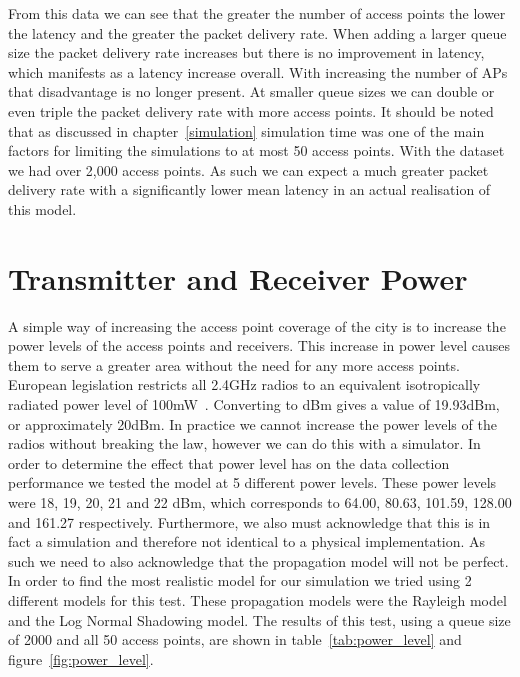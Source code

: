         From this data we can see that the greater the number of access points the lower the latency and the greater the packet delivery rate. When adding a larger queue size the packet delivery rate increases but there is no improvement in latency, which manifests as a latency increase overall. With increasing the number of APs that disadvantage is no longer present. At smaller queue sizes we can double or even triple the packet delivery rate with more access points. It should be noted that as discussed in chapter~\ref{simulation} simulation time was one of the main factors for limiting the simulations to at most 50 access points. With the dataset we had over 2,000 access points. As such we can expect a much greater packet delivery rate with a significantly lower mean latency in an actual realisation of this model. 


    \section{Transmitter and Receiver Power}\label{data_gathering_performance_transmitter_and_reciever_power}

        A simple way of increasing the access point coverage of the city is to increase the power levels of the access points and receivers. This increase in power level causes them to serve a greater area without the need for any more access points. European legislation restricts all 2.4GHz radios to an equivalent isotropically radiated power level of 100mW~\cite{rackley2011wireless}. Converting to dBm gives a value of 19.93dBm, or approximately 20dBm. In practice we cannot increase the power levels of the radios without breaking the law, however we can do this with a simulator. In order to determine the effect that power level has on the data collection performance we tested the model at 5 different power levels. These power levels were 18, 19, 20, 21 and 22 dBm, which corresponds to 64.00, 80.63, 101.59, 128.00 and 161.27 respectively. Furthermore, we also must acknowledge that this is in fact a simulation and therefore not identical to a physical implementation. As such we need to also acknowledge that the propagation model will not be perfect. In order to find the most realistic model for our simulation we tried using 2 different models for this test. These propagation models were the Rayleigh model and the Log Normal Shadowing model. The results of this test, using a queue size of 2000 and all 50 access points, are shown in table~\ref{tab:power_level} and figure~\ref{fig:power_level}. 

